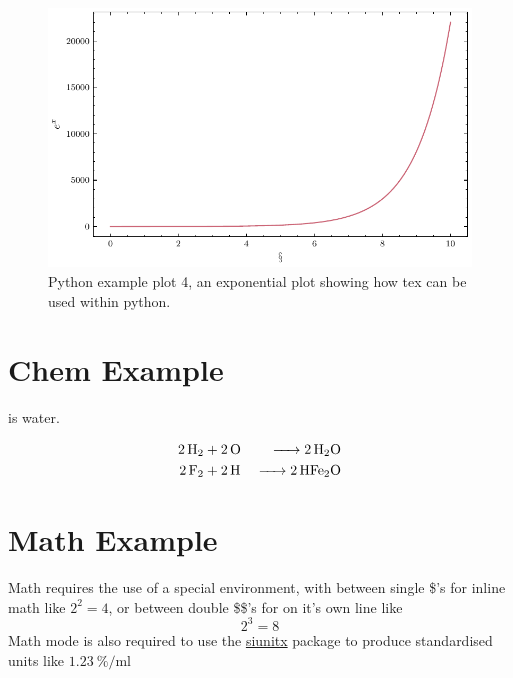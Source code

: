 \begin{figure}[h!]
    \centering
    \includegraphics{Python_plotting_example/example_4.pdf}
    \caption[Python example plot 4]{Python example plot 4, an exponential plot showing how tex can be used within python.}
    \label{fig:ch2/example_4}
\end{figure}



\section{Chem Example}


 is water. 


\begin{align}
    \ce{2H2& + 2O &-> 2H2O} \\
   \ce{2F2& + 2H &-> 2HFe2O}
\end{align}


\section{Math Example}
Math requires the use of a special environment, with between single \$'s for inline math like $2^2=4$, or between double \$\$'s for on it's own line like $$2^3=8$$ Math mode is also required to use the \href{https://mirror.aarnet.edu.au/pub/CTAN/macros/latex/contrib/siunitx/siunitx.pdf}{siunitx} package to produce standardised units like $\SI{1.23}{\percent\per\milli\litre}$

